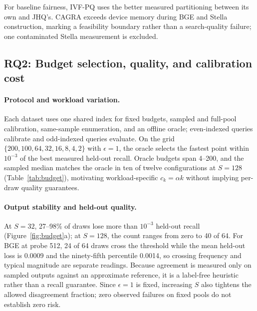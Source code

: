 For baseline fairness, IVF-PQ uses the better measured partitioning between
its own and JHQ's. CAGRA exceeds device memory during BGE and Stella
construction, marking a feasibility boundary rather than a search-quality
failure; one contaminated Stella measurement is excluded.

\subsection{RQ2: Budget selection, quality, and calibration cost}
\label{sec:rq2}
\paragraph{Protocol and workload variation.}
Each dataset uses one shared index for fixed budgets, sampled and full-pool
calibration, same-sample enumeration, and an offline oracle; even-indexed
queries calibrate and odd-indexed queries evaluate. On the grid
$\{200,100,64,32,16,8,4,2\}$ with $\epsilon=1$, the oracle selects the fastest
point within $10^{-3}$ of the best measured held-out recall. Oracle budgets
span 4--200, and the sampled median matches the oracle in ten of twelve
configurations at $S=128$ (Table~\ref{tab:budget}), motivating
workload-specific $c_k=\alpha k$ without implying per-draw quality guarantees.

\begin{table}[bp]
\centering
\caption{Held-out budget comparison, $\epsilon=1$, $\alpha_{\max}=200$. Each
cell gives $\alpha$ and Recall@10, then kQPS. Rule entries are the median
$\alpha$, mean recall and mean selected-arm QPS over 64 draws at $S=128$.}
\label{tab:budget}

\end{table}

\paragraph{Output stability and held-out quality.}
At $S=32$, 27--98\% of draws lose more than $10^{-3}$ held-out recall
(Figure~\ref{fig:budget}a); at $S=128$, the count ranges from zero to 40 of
64. For BGE at probe 512, 24 of 64 draws cross the threshold while the mean
held-out loss is 0.0009 and the ninety-fifth percentile 0.0014, so crossing
frequency and typical magnitude are separate readings. Because agreement is
measured only on sampled outputs against an approximate reference, it is a
label-free heuristic rather than a recall guarantee. Since $\epsilon=1$ is
fixed, increasing $S$ also tightens the allowed disagreement fraction; zero
observed failures on fixed pools do not establish zero risk.

